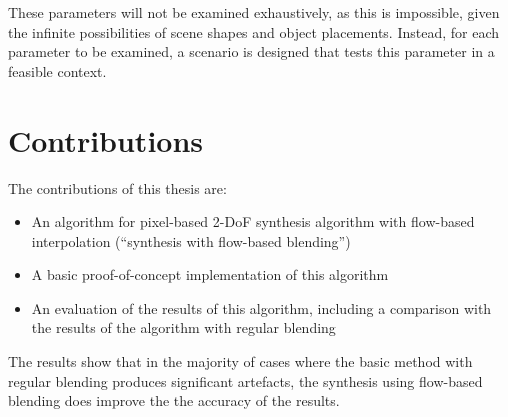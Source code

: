 \noindent
These parameters will not be examined exhaustively, as this is impossible, given the infinite possibilities of scene shapes and object placements. Instead, for each parameter to be examined, a scenario is designed that tests this parameter in a feasible context.


%
%
%
%


\section*{Contributions}
The contributions of this thesis are:
\begin{itemize}
  \item An algorithm for pixel-based 2-DoF synthesis algorithm with flow-based interpolation (``synthesis with flow-based blending'')
  \item A basic proof-of-concept implementation of this algorithm
  \item An evaluation of the results of this algorithm, including a comparison with the results of the algorithm with regular blending
\end{itemize}

\noindent
The results show that in the majority of cases where the basic method with regular blending produces significant artefacts, the synthesis using flow-based blending does improve the the accuracy of the results. 

